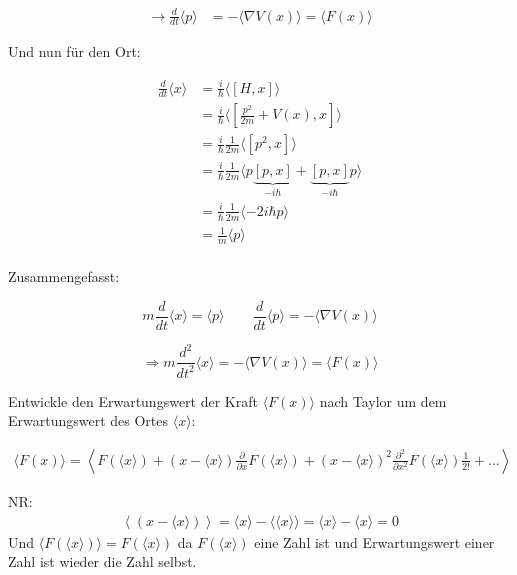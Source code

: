 \begin{align}
\rightarrow \frac{d}{dt} \langle p \rangle  &=  -\langle  \nabla V(x) \rangle = \langle F(x) \rangle  
\end{align}

Und nun für den Ort:

\begin{align}
 \frac{d}{dt} \langle x \rangle  &= \frac{i}{\hbar} \langle [H,x]\rangle \\
&= \frac{i}{\hbar} \langle [\frac{p^2}{2m}+V(x),x]\rangle   \\
&= \frac{i}{\hbar}\frac{1}{2m} \langle [p^2,x]\rangle   \\
&= \frac{i}{\hbar}\frac{1}{2m} \langle p\underbrace{ [p,x]}_{-i\hbar}+\underbrace{ [p,x]}_{-i\hbar}p\rangle   \\
&= \frac{i}{\hbar}\frac{1}{2m} \langle -2i\hbar p\rangle   \\
&= \frac{1}{m} \langle p \rangle   \\
\end{align}

Zusammengefasst:

\[ m \frac{d}{dt} \langle x \rangle  = \langle p \rangle \qquad \frac{d}{dt} \langle p \rangle  =  -\langle  \nabla V(x) \rangle \]


\begin{equation} 
\label{eq:42}
\Rightarrow m \frac{d^2}{dt^2} \langle x \rangle  =  -\langle  \nabla V(x) \rangle =  \langle F(x) \rangle 
\end{equation}

Entwickle den Erwartungswert der Kraft \(\langle F(x)\rangle \) nach Taylor um dem Erwartungswert des Ortes \(\langle x\rangle \):

\begin{align}
 \langle F(x) \rangle = \left\langle  F(\langle x\rangle ) + (x-\langle x\rangle) \frac{\partial }{\partial x} F(\langle x\rangle )+(x-\langle x\rangle)^2 \frac{\partial^2 }{\partial x^2} F(\langle x\rangle )\frac{1}{2!}+\dots \right\rangle 
\end{align}


NR: 
\begin{align}
\left\langle(x-\langle x\rangle) \right\rangle = \langle x\rangle -\langle \langle x\rangle \rangle  = \langle x\rangle -\langle x\rangle  = 0
\end{align}
Und \( \langle F(\langle x \rangle )\rangle  = F(\langle x \rangle )  \) da \(F(\langle x\rangle )\) eine Zahl ist und Erwartungswert einer Zahl ist wieder die Zahl selbst.

